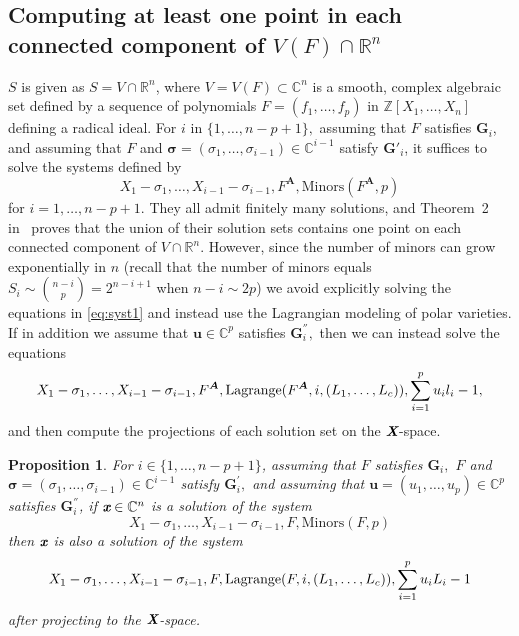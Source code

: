 \documentclass[a4paper]{article}
\def\Xb{\textit{\textbf{X}}}
\def\mA{{\bm A}}
\def\ub{{\bm u}}
\def\xb{\textit{\textbf{x}}}
\def\minors{\textrm{Minors}(F,p)}
\def\minorsA{\textrm{Minors}(F^{\mA},p)}
\DeclareMathOperator{\lag}{Lagrange}
\newcommand{\ZZ}{{\mathbb{Z}}}
\def\C{\mathbb{C}}
\def\R{\mathbb{R}}
\def\lagF{{\bm\lag}(F,i,(L_1,\hdots,L_c))}
\def\lagFA{{\bm\lag}(F^{\mA},i,(L_1,\hdots,L_c))}
\def\udl{\sum_{i=1}^pu_il_i}
\newtheorem{prop}[theorem]{Proposition}
\begin{document}
\subsection{Computing at least one point in each connected component of $V(F) \cap \R^n$} 
%
$S$ is given as $S=V \cap
\R^n$, where $V=V(F) \subset \C^n$ is a smooth, complex algebraic set defined
by a sequence of polynomials $F = (f_1,\hdots,f_p)$ in $\ZZ[X_1,\dots,X_n]$ defining a radical ideal. For $i$ in $\{1,\hdots,n-p+1\},$ assuming that $F$ satisfies $\textbf{G}_i$, and assuming that $F$ and $\bm \sigma = (\sigma_1,\hdots,\sigma_{i-1}) \in \C^{i-1}$ satisfy $\textbf{G}'_i$, it suffices to solve the systems defined by
%
\begin{equation}\label{eq:syst1}
X_1-\sigma_1,\dots,X_{i-1}-\sigma_{i-1}, F^{\mA},  \minorsA  
\end{equation}
%
for $i=1,\dots,n-p+1$.  They all admit finitely many solutions, and
Theorem~2 in~\cite{EMP} proves that the union of their solution sets
contains one point on each connected component of $V \cap \R^n$. However, since the number of minors can grow exponentially in $n$ (recall that the number of minors equals $S_i \sim  \binom{n-i}{p}= 2^{n-i+1}$ when $n-i \sim 2p$)
we avoid explicitly solving the equations in \eqref{eq:syst1} and instead use the Lagrangian modeling of polar varieties. If in addition we assume that $\ub \in \C^p$ satisfies $\textbf{G}_i^{''},$ then we can instead solve the equations
%
\begin{equation}\label{eq:syst2}
X_1-\sigma_1,\dots,X_{i-1}-\sigma_{i-1}, F^{\mA}, \lagFA ,\udl-1,
\end{equation}
%
and then compute the projections of each solution set on the $\Xb$-space. 
%
\begin{prop}\label{prop:correctness}
For $i\in\{1,\hdots,n-p+1\}$, assuming that $F$ satisfies $\bm G_i,$ $F$ and $\bm \sigma = (\sigma_1,\hdots,\sigma_{i-1}) \in \C^{i-1}$ satisfy $\bm G_i^{'},$ and assuming that $\ub = (u_1,\hdots,u_p) \in \C^p$ satisfies $\bm G_i^{''}$, if $\xb \in \C^n$ is a solution of the system 
\begin{equation}\label{sys:minors}
X_1 - \sigma_1,\hdots,X_{i-1} - \sigma_{i-1}, F, \minors  
\end{equation}
then $\xb$ is also a solution of the system 
\begin{equation}\label{sys:lag}
X_1 - \sigma_1,\hdots,X_{i-1} - \sigma_{i-1}, F,\lagF,\sum_{i=1}^p u_i L_i -1
\end{equation}
after projecting to the $\Xb$-space. 
\end{prop}
\end{document}
